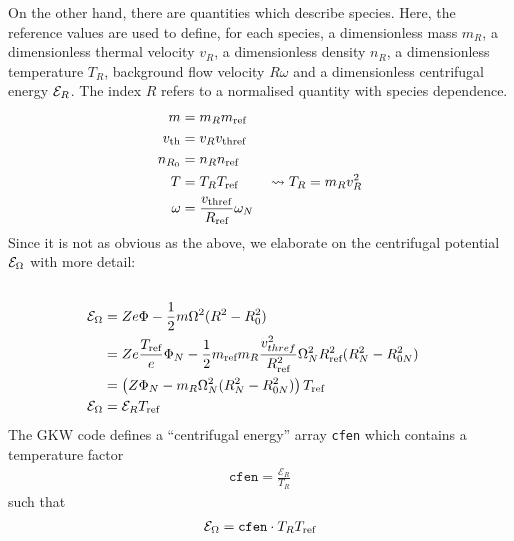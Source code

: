 On the other hand, there are quantities which describe species.
Here, the reference values are used to define, for each species, a dimensionless mass $m_R$, a dimensionless thermal 
velocity $v_R$, a dimensionless density $n_R$, a dimensionless temperature $T_R$, background flow velocity $R\omega$ and a dimensionless centrifugal energy $\mathcal{E}_R$.
The index $R$ refers to a normalised quantity with species dependence. 
\begin{align} 
m &= m_R m_{\rm ref}
\\
v_{\rm th} &=  v_R v_{\rm thref}
\\
n_{R_0} &= n_R n_{\rm ref} 
\\
T &= T_R T_{\rm ref} \qquad\leadsto T_R = m_Rv_R^2
\label{eq:normalise-T}
\\
\omega &= \frac{v_{\rm thref} }{R_{\text{ref}}} \omega_N
\end{align}
Since it is not as obvious as the above, we elaborate on the centrifugal potential $\mathcal{E}_\Omega$ with more detail:
\begin{align}
\\
 \mathcal{E}_\Omega &= Ze \Phi - \frac{1}{2}m\Omega^2(R^2 - R_0^2)
\nonumber\\ 
& = Ze\frac{T_{\text{ref}} }{e}\Phi_N - \frac{1}{2}m_{\text{ref}} m_R\frac{v_{thref}^2}{R_{\text{ref}} ^2}\Omega_N^2R_{\text{ref}} ^2(R_N^2-R_{0N}^2) \nonumber\\
 & =  \left(Z\Phi_N - m_R\Omega_N^2(R_N^2 - R_{0N}^2)\right) T_{\text{ref}}\nonumber\\
 \mathcal{E}_\Omega &=\mathcal{E}_R T_{\rm ref}
\label{eq:normalise-cfen}
\end{align} 
The GKW code defines a ``centrifugal energy'' array \texttt{cfen} which contains a temperature factor
\begin{align}
  \mathtt{cfen} = \frac{\mathcal{E}_R}{T_R}
\label{eq:cfen-vs-ER}
\end{align}
such that
\begin{align}
  \mathcal{E}_\Omega = \mathtt{cfen}\cdot T_RT_{\text{ref}}
\end{align}

